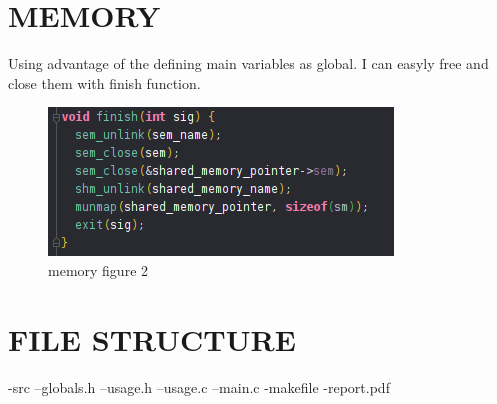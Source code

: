 \documentclass{article}
\begin{document}
\section{MEMORY}
Using advantage of the defining main variables as global. I can easyly free and close them with finish function.
    \begin{figure}[htbp!]  
    \centering
    \includegraphics[scale=1]{memory.png}
    \caption{memory figure 2}
    \label{fig:memory}
\end{figure}

\section{FILE STRUCTURE}
-src
--globals.h
--usage.h
--usage.c
--main.c
-makefile
-report.pdf
\end{document}
